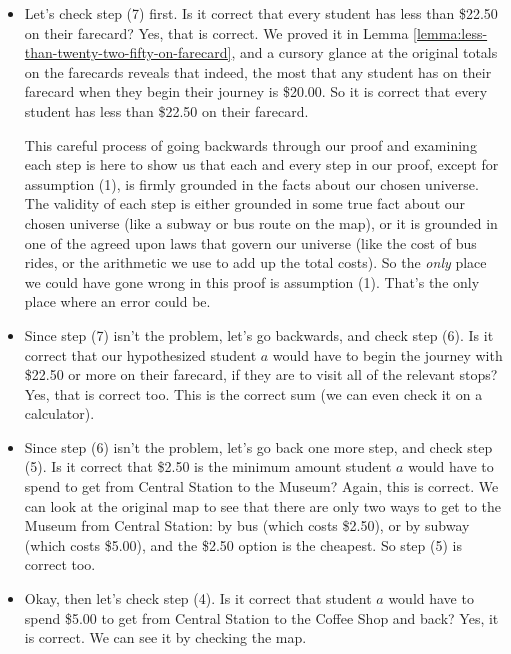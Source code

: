 \documentclass[../../../main.tex]{subfiles}
\begin{document}
\begin{itemize}

  \item Let's check step (7) first. Is it correct that every student has less than \$22.50 on their farecard? Yes, that is correct. We proved it in Lemma \ref{lemma:less-than-twenty-two-fifty-on-farecard}, and a cursory glance at the original totals on the farecards reveals that indeed, the most that any student has on their farecard when they begin their journey is \$20.00. So it is correct that every student has less than \$22.50 on their farecard.

  \begin{aside}
    \begin{remark}
      This careful process of going backwards through our proof and examining each step is here to show us that each and every step in our proof, except for assumption (1), is firmly grounded in the facts about our chosen universe. The validity of each step is either grounded in some true fact about our chosen universe (like a subway or bus route on the map), or it is grounded in one of the agreed upon laws that govern our universe (like the cost of bus rides, or the arithmetic we use to add up the total costs). So the \emph{only} place we could have gone wrong in this proof is assumption (1). That's the only place where an error could be.
    \end{remark}
  \end{aside}
  
  \item Since step (7) isn't the problem, let's go backwards, and check step (6). Is it correct that our hypothesized student $a$ would have to begin the journey with \$22.50 or more on their farecard, if they are to visit all of the relevant stops? Yes, that is correct too. This is the correct sum (we can even check it on a calculator).
  
  \item Since step (6) isn't the problem, let's go back one more step, and check step (5). Is it correct that \$2.50 is the minimum amount student $a$ would have to spend to get from Central Station to the Museum? Again, this is correct. We can look at the original map to see that there are only two ways to get to the Museum from Central Station: by bus (which costs \$2.50), or by subway (which costs \$5.00), and the \$2.50 option is the cheapest. So step (5) is correct too.
    
  \item Okay, then let's check step (4). Is it correct that student $a$ would have to spend \$5.00 to get from Central Station to the Coffee Shop and back? Yes, it is correct. We can see it by checking the map.
  

\end{itemize}
\end{document}
